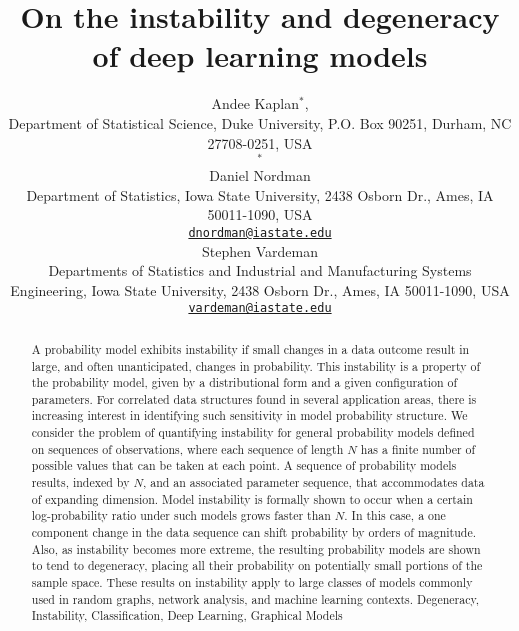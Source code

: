 \documentclass[numbib]{imamat}
\theoremstyle{theorem}
\theoremstyle{lemma}
\theoremstyle{example}
\theoremstyle{corollary}
\theoremstyle{definition}
\theoremstyle{remark}
\theoremstyle{approximation}
\theoremstyle{scheme}
\newcommand{\ak}[1]{{\color{blue} #1}}
\begin{document}
\title{On the instability and degeneracy of deep learning models}

\author{{\sc Andee Kaplan}\(^*\), \\[2pt] Department of Statistical Science, Duke University, P.O. Box 90251, Durham, NC 27708-0251, USA \\ \(^*\){}
\\[6pt] {\sc Daniel Nordman} \\[2pt] Department of Statistics, Iowa State University, 2438 Osborn Dr., Ames, IA 50011-1090, USA \\ {\href{mailto:dnordman@iastate.edu}{\nolinkurl{dnordman@iastate.edu}}}  
\\[6pt] {\sc Stephen Vardeman} \\[2pt] Departments of Statistics and Industrial and Manufacturing Systems Engineering, Iowa State University, 2438 Osborn Dr., Ames, IA 50011-1090, USA \\ {\href{mailto:vardeman@iastate.edu}{\nolinkurl{vardeman@iastate.edu}}}  
}

\maketitle


\begin{abstract}
{A probability model exhibits instability if small changes in a data outcome result in large, and often unanticipated, changes in probability. This instability is a property of the probability \ak{model, given by a distributional form and a given configuration of parameters}. For correlated data structures found in several application areas, there is increasing interest in \ak{identifying} such sensitivity in model probability structure. We consider the problem of quantifying instability for general probability models defined on sequences of observations, where each sequence of length \(N\) has a finite number of possible values \ak{that can be taken at each point}. A sequence of probability models results, indexed by \(N\), \ak{and an associated parameter sequence,} that accommodates data of expanding dimension. Model instability is formally shown to occur when a certain log-probability ratio under such models grows faster than \(N\). In this case, a one component change in the data sequence can shift probability by orders of magnitude. Also, as instability becomes more extreme, the resulting probability models are shown to tend to degeneracy, placing all their probability on potentially small portions of the sample space. These results on instability apply to large classes of models commonly used in random graphs, network analysis, and machine learning contexts.}
{Degeneracy, Instability, Classification, Deep Learning, Graphical Models}
\end{abstract}
\end{document}
